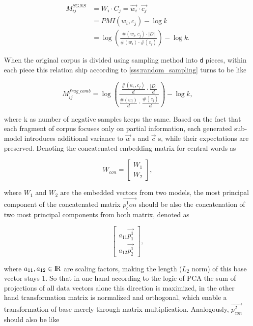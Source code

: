   \begin{equation}
  \begin{split}
    M^{SGNS}_{ij} &= W_i\cdot C_j = \vec{w_i}\cdot\vec{c_j}\\
                  &= PMI(w_i, c_j) - \log k\\
                  &= \log {(\frac{\#(w_i,c_j)\cdot|D|}{\#(w_i)\cdot\#(c_j)})} - \log k.
  \end{split}
  \end{equation}

  When the original corpus is divided using sampling method into \verb|d| pieces, within each piece this relation ship according to \ref{sss:random_sampling} turns to be like

  \begin{equation}
    M^{frag\_comb}_{ij} = \log (\frac{{\frac{\#(w_i,c_j)}{d}}\cdot{\frac{|D|}{d}}} {{\frac{\#(w_i)}{d}}\cdot{\frac{\#(c_j)}{d}}}) - \log k,
  \end{equation}

  where k as number of negative samples keeps the same. Based on the fact that each fragment of corpus focuses only on partial information, each generated sub-model introduces additional variance to $\vec{w}$ s and $\vec{c}$ s, while their expectations are preserved. Denoting the concatenated embedding matrix for central words as

  \[W_{con}=\begin{bmatrix}
              W_1\\
              W_2
            \end{bmatrix},\]

  where $W_1$ and $W_2$ are the embedded vectors from two models, the most principal component of the concatenated matrix $\vec{p^1_con}$ should be also the concatenation of two most principal components from both matrix, denoted as 

  \[\begin{bmatrix}
      a_{11}\vec{p^1_1}\\
      a_{12}\vec{p^1_2}
    \end{bmatrix},\] 

  where $a_{11}, a_{12}\in{\rm I\!R}$ are scaling factors, making the length ($L_2$ norm) of this base vector stays 1. So that in one hand according to the logic of PCA the sum of projections of all data vectors alone this direction is maximized, in the other hand transformation matrix is normalized and orthogonal, which enable a transformation of base merely through matrix multiplication. Analogously, $\vec{p^2_{con}}$ should also be like

